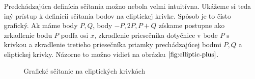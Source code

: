 Predchádzajúca definícia sčítania možno nebola veľmi intuitívna.
Ukážeme si teda iný prístup k definícii sčítania bodov na eliptickej
krivke. Spôsob je to čisto grafický.
Ak máme body $P,Q$, body $-P, 2P, P+Q$ získame postupne ako
zrkadlenie bodu $P$ podľa osi $x$,
zkradlenie priesečníka dotyčnice v bode $P$ s krivkou
a zkradlenie tretieho priesečníka priamky prechádzajúcej bodmi $P,Q$ a
eliptickej krivky. Názorne to možno vidieť na obrázku
$\ref{fig:elliptic-plus}$.

\begin{figure}
    \centering

    \caption{Grafické sčítanie na eliptických krivkách}
    \label{fig:elliptic-plus}
\end{figure}

